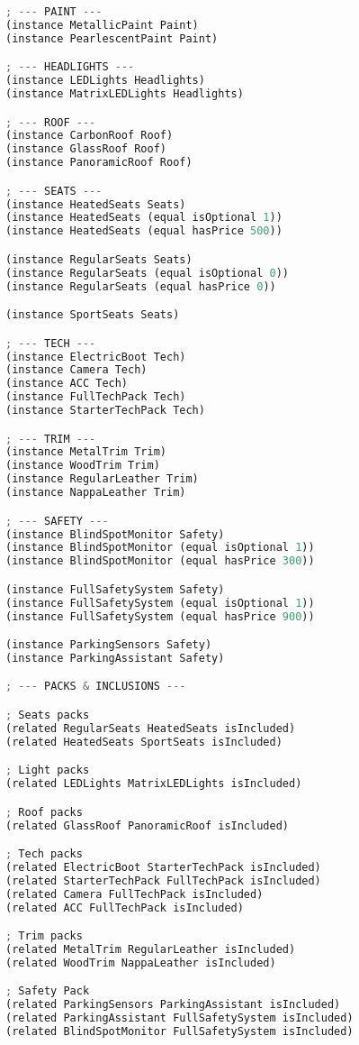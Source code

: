 \documentclass[a4paper,12pt]{report}
\begin{document}
\begin{lstlisting}[language=Octave]
; --- PAINT ---
(instance MetallicPaint Paint)
(instance PearlescentPaint Paint)

; --- HEADLIGHTS ---
(instance LEDLights Headlights)
(instance MatrixLEDLights Headlights)

; --- ROOF ---
(instance CarbonRoof Roof)
(instance GlassRoof Roof)
(instance PanoramicRoof Roof)

; --- SEATS ---
(instance HeatedSeats Seats)
(instance HeatedSeats (equal isOptional 1))
(instance HeatedSeats (equal hasPrice 500))

(instance RegularSeats Seats)
(instance RegularSeats (equal isOptional 0))
(instance RegularSeats (equal hasPrice 0))

(instance SportSeats Seats)

; --- TECH ---
(instance ElectricBoot Tech)
(instance Camera Tech)
(instance ACC Tech)
(instance FullTechPack Tech)
(instance StarterTechPack Tech)

; --- TRIM ---
(instance MetalTrim Trim)
(instance WoodTrim Trim)
(instance RegularLeather Trim)
(instance NappaLeather Trim)

; --- SAFETY ---
(instance BlindSpotMonitor Safety)
(instance BlindSpotMonitor (equal isOptional 1))
(instance BlindSpotMonitor (equal hasPrice 300))

(instance FullSafetySystem Safety)
(instance FullSafetySystem (equal isOptional 1))
(instance FullSafetySystem (equal hasPrice 900))

(instance ParkingSensors Safety)
(instance ParkingAssistant Safety)

; --- PACKS & INCLUSIONS ---

; Seats packs
(related RegularSeats HeatedSeats isIncluded)
(related HeatedSeats SportSeats isIncluded)

; Light packs
(related LEDLights MatrixLEDLights isIncluded)

; Roof packs
(related GlassRoof PanoramicRoof isIncluded)

; Tech packs
(related ElectricBoot StarterTechPack isIncluded)
(related StarterTechPack FullTechPack isIncluded)
(related Camera FullTechPack isIncluded)
(related ACC FullTechPack isIncluded)

; Trim packs
(related MetalTrim RegularLeather isIncluded)
(related WoodTrim NappaLeather isIncluded)

; Safety Pack
(related ParkingSensors ParkingAssistant isIncluded)
(related ParkingAssistant FullSafetySystem isIncluded)
(related BlindSpotMonitor FullSafetySystem isIncluded)


\end{lstlisting}
\end{document}
